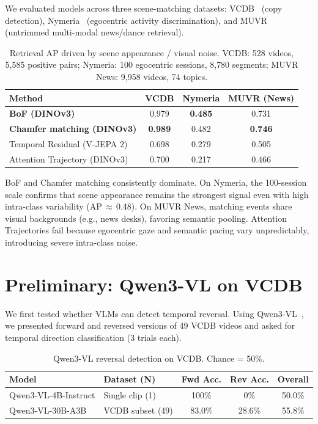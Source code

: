 \documentclass{article}
\theoremstyle{remark}
\begin{document}
We evaluated models across three scene-matching datasets: VCDB~\cite{vcdb} (copy detection), Nymeria~\cite{nymeria} (egocentric activity discrimination), and MUVR~\cite{muvr} (untrimmed multi-modal news/dance retrieval).

\begin{table}[h]
\centering
\caption{Retrieval AP driven by scene appearance / visual noise. VCDB: 528 videos, 5{,}585 positive pairs; Nymeria: 100 egocentric sessions, 8{,}780 segments; MUVR News: 9{,}958 videos, 74 topics.}
\label{tab:scene_matching}
\begin{tabular}{lccc}
\toprule
\textbf{Method} & \textbf{VCDB} & \textbf{Nymeria} & \textbf{MUVR (News)} \\
\midrule
\textbf{BoF (DINOv3)} & 0.979 & \textbf{0.485} & 0.731 \\
\textbf{Chamfer matching (DINOv3)} & \textbf{0.989} & 0.482 & \textbf{0.746} \\
Temporal Residual (V-JEPA 2) & 0.698 & 0.279 & 0.505 \\
Attention Trajectory (DINOv3) & 0.700 & 0.217 & 0.466 \\
\bottomrule
\end{tabular}
\end{table}

BoF and Chamfer matching consistently dominate. On Nymeria, the 100-session scale confirms that scene appearance remains the strongest signal even with high intra-class variability (AP\,$\approx$\,0.48). On MUVR News, matching events share visual backgrounds (e.g., news desks), favoring semantic pooling. Attention Trajectories fail because egocentric gaze and semantic pacing vary unpredictably, introducing severe intra-class noise.

\section{Preliminary: Qwen3-VL on VCDB}
\label{sec:qwen_vcdb}

We first tested whether VLMs can detect temporal reversal. Using Qwen3-VL~\cite{qwen3vl}, we presented forward and reversed versions of 49 VCDB videos and asked for temporal direction classification (3 trials each).

\begin{table}[h]
\centering
\caption{Qwen3-VL reversal detection on VCDB. Chance = 50\%.}
\label{tab:qwen_vcdb}
\begin{tabular}{llccc}
\toprule
\textbf{Model} & \textbf{Dataset (N)} & \textbf{Fwd Acc.} & \textbf{Rev Acc.} & \textbf{Overall} \\
\midrule
Qwen3-VL-4B-Instruct & Single clip (1) & 100\% & 0\% & 50.0\% \\
Qwen3-VL-30B-A3B & VCDB subset (49) & 83.0\% & 28.6\% & 55.8\% \\
\bottomrule
\end{tabular}
\end{table}
\end{document}
